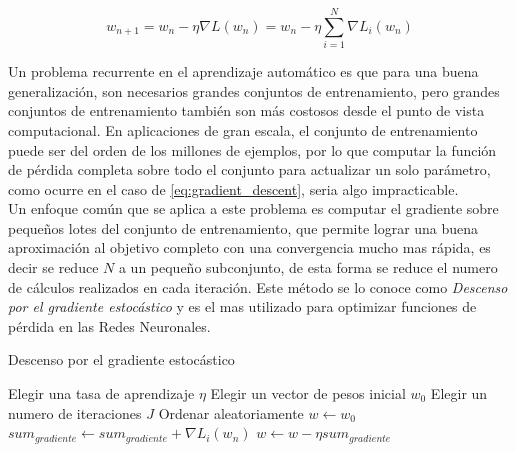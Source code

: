 \documentclass[a4paper,11pt,spanish]{book}
\begin{document}
      \begin{equation}\label{eq:gradient_descent}
	w_{n+1} = w_n - \eta \nabla L(w_n)  = w_n - \eta \sum_{i=1}^{N} \nabla L_i(w_n)
      \end{equation}

      Un problema recurrente en el aprendizaje automático es que para una buena generalización, son necesarios grandes conjuntos de entrenamiento,
      pero grandes conjuntos de entrenamiento también son más costosos desde el punto de vista computacional.
      En aplicaciones de gran escala, el conjunto de entrenamiento puede ser del orden de los millones de ejemplos, por lo que computar la función de
      pérdida completa sobre todo el conjunto para actualizar un solo parámetro, como ocurre en el caso de \eqref{eq:gradient_descent}, seria algo impracticable.\\
      Un enfoque común que se aplica a este problema es computar el gradiente sobre pequeños lotes del conjunto de entrenamiento,
      que permite lograr una buena aproximación al objetivo completo con una convergencia mucho mas rápida, es decir se reduce $N$ a un pequeño subconjunto, de esta forma se
      reduce el numero de cálculos realizados en cada iteración. Este método se lo conoce como \emph{Descenso por el gradiente estocástico} y es el mas utilizado para optimizar
      funciones de pérdida en las Redes Neuronales.

	\begin{algorithm}[H]
	  \caption{Descenso por el gradiente estocástico}
	  \label{SGD}
	  \begin{algorithmic}
	    \State Elegir una tasa de aprendizaje $\eta$
	    \State Elegir un vector de pesos inicial $w_0$
	    \State Elegir un numero de iteraciones $J$
	    \State Ordenar aleatoriamente
	    \State $w \gets w_0$
		$sum_{gradiente} \gets sum_{gradiente} + \nabla L_i(w_n)$
	      \EndFor
	      \State $w \gets w - \eta sum_{gradiente}$
	    \EndFor
	  \end{algorithmic}
	\end{algorithm}
\end{document}
